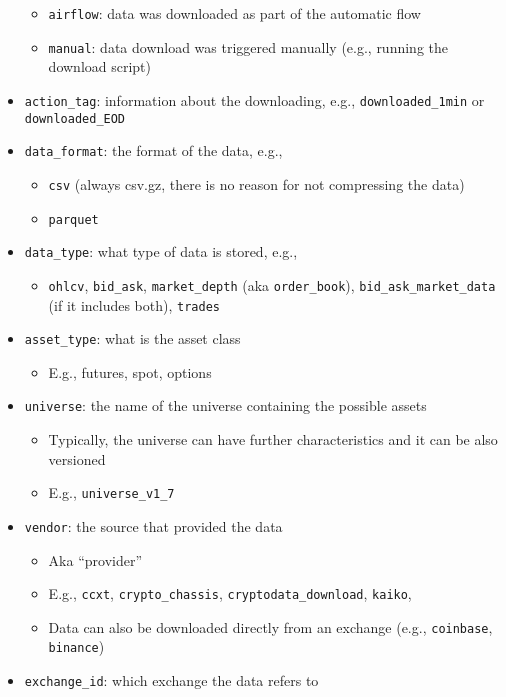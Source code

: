 \documentclass[11pt, reqno]{amsart}
\theoremstyle{definition}
\theoremstyle{remark}
\begin{document}
\begin{itemize}
        \begin{itemize}
          \item \verb|airflow|: data was downloaded as part of the automatic flow
          \item \verb|manual|: data download was triggered manually (e.g., running
                the download script)
        \end{itemize}
  \item \verb|action_tag|: information about the downloading, e.g.,
        \verb|downloaded_1min| or \verb|downloaded_EOD|
  \item \verb|data_format|: the format of the data, e.g.,

        \begin{itemize}
          \item \verb|csv| (always csv.gz, there is no reason for not compressing
                the data)
          \item \verb|parquet|
        \end{itemize}
  \item \verb|data_type|: what type of data is stored, e.g.,

        \begin{itemize}
          \item \verb|ohlcv|, \verb|bid_ask|, \verb|market_depth| (aka
                \verb|order_book|), \verb|bid_ask_market_data| (if it
                includes both), \verb|trades|
        \end{itemize}
  \item \verb|asset_type|: what is the asset class

        \begin{itemize}
          \item E.g., futures, spot, options
        \end{itemize}
  \item \verb|universe|: the name of the universe containing the possible
        assets

        \begin{itemize}
          \item Typically, the universe can have further characteristics and it can
                be also versioned
          \item E.g., \verb|universe_v1_7|
        \end{itemize}
  \item \verb|vendor|: the source that provided the data

        \begin{itemize}
          \item Aka ``provider''
          \item E.g., \verb|ccxt|, \verb|crypto_chassis|,
                \verb|cryptodata_download|, \verb|kaiko|,
          \item Data can also be downloaded directly from an exchange (e.g.,
                \verb|coinbase|, \verb|binance|)
        \end{itemize}
  \item \verb|exchange_id|: which exchange the data refers to


\end{itemize}
\end{document}
